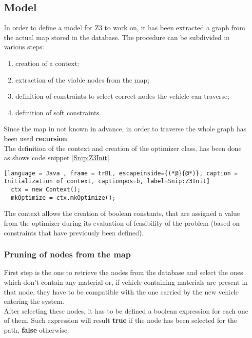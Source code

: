 
\subsection{Model}
In order to define a model for Z3 to work on, it has been extracted a graph from the actual map stored in the database. The procedure can be subdivided in various steps:
\begin{enumerate}
  \item creation of a context;
  \item extraction of the viable nodes from the map;
  \item definition of constraints to select correct nodes the vehicle can traverse;
  \item definition of soft constraints.
\end{enumerate}
Since the map in not known in advance, in order to traverse the whole graph has been used \textbf{recursion}.\\
The definition of the context and creation of the optimizer class, has been done as shows code snippet \ref{Snip:Z3Init}.
\begin{lstlisting}[language = Java , frame = trBL, escapeinside={(*@}{@*)}, caption = Initialization of context, captionpos=b, label=Snip:Z3Init]
  ctx = new Context();
  mkOptimize = ctx.mkOptimize();
\end{lstlisting}
The context allows the creation of boolean constants, that are assigned a value from the optimizer during its evaluation of feasibility of the problem (based on constraints that have previously been defined).

\subsubsection{Pruning of nodes from the map}
First step is the one to retrieve the nodes from the database and select the ones which don't contain any material or, if vehicle containing materials are present in that node, they have to be compatible with the one carried by the new vehicle entering the system.\\
After selecting these nodes, it has to be defined a boolean expression for each one of them. Such expression will result \textbf{true} if the node has been selected for the path, \textbf{false} otherwise.\\

